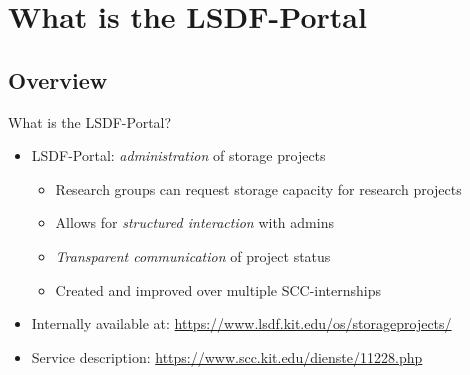 \section{What is the LSDF-Portal}



\subsection{Overview}

\begin{frame}[c,fragile]{What is the LSDF-Portal?}
    \large
    \begin{itemize}[<+(1)->]
        \item LSDF-Portal: {\em administration} of storage projects
            \begin{itemize}[<+(1)->]
                \item Research groups can request storage capacity for research projects
                \item Allows for {\em structured interaction} with admins
                \item {\em Transparent communication} of project status
                \item Created and improved over multiple SCC-internships
            \end{itemize}
        \item Internally available at: \url{https://www.lsdf.kit.edu/os/storageprojects/}
        \item Service description: \url{https://www.scc.kit.edu/dienste/11228.php}
    \end{itemize}
\end{frame}

